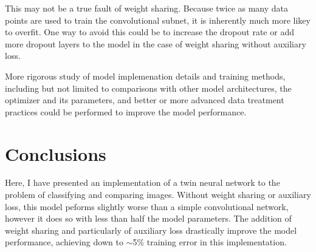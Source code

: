 \documentclass[prl, article, twocolumn]{revtex4-1}
\begin{document}
This may not be a true fault of weight sharing. Because twice as many data points are used to train the convolutional subnet, it is inherently much more likey to overfit. One way to avoid this could be to increase the dropout rate or add more dropout layers to the model in the case of weight sharing without auxiliary loss.

More rigorous study of model implemenation details and training methods, including but not limited to comparisons with other model architectures, the optimizer and its parameters, and better or more advanced data treatment practices could be performed to improve the model performance.

\section{Conclusions}
Here, I have presented an implementation of a twin neural network to the problem of classifying and comparing images. Without weight sharing or auxiliary loss, this model peforms slightly worse than a simple convolutional network, however it does so with less than half the model parameters. The addition of weight sharing and particularly of auxiliary loss drastically improve the model performance, achieving down to $\sim$5\% training error in this implementation.
\end{document}
